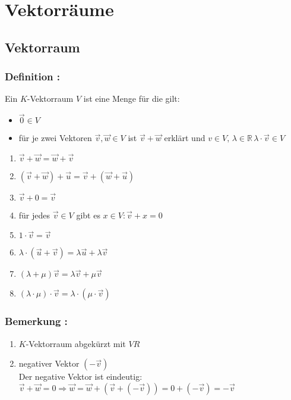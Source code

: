 \section{Vektorräume}
%
%
%
\subsection{Vektorraum}
%
\subsubsection{Definition :}
Ein $K$-Vektorraum $V$ ist eine Menge für die gilt:
\begin{itemize}
	\item $\vec{0}\in V$
	\item für je zwei Vektoren $\vec{v},\vec{w}\in V$ ist $\vec{v}+\vec{w}$ erklärt und $v \in V, 
		\, \lambda \in \mathbb{R} \, \lambda \cdot \vec{v} \in V$
\end{itemize}
%
\begin{multicols}{2} 
\begin{enumerate}
	\item $\vec{v} + \vec{w} = \vec{w} + \vec{v}$
	\item $(\vec{v}+\vec{w})+\vec{u}=\vec{v}+(\vec{w}+\vec{u})$
	\item $\vec{v}+0=\vec{v}$
	\item für jedes $\vec{v} \in V$ gibt es $x \in V:\vec{v}+x=0$
	\item $1\cdot \vec{v}=\vec{v}$
	\item $\lambda\cdot(\vec{u}+\vec{v})=\lambda\vec{u}+\lambda\vec{v}$
	\item$(\lambda+\mu)\vec{v}=\lambda\vec{v}+\mu\vec{v}$
	\item $(\lambda \cdot \mu)\cdot \vec{v} = \lambda \cdot (\mu\cdot\vec{v})$
\end{enumerate}
\end{multicols}
%
%
%
\subsubsection{Bemerkung :}
\begin{enumerate}
	\item $K$-Vektorraum abgekürzt mit $VR$
	\item negativer Vektor $(-\vec{v})$\\
		Der negative Vektor ist eindeutig: $\vec{v}+\vec{w}=0 \Rightarrow 
		\vec{w}=\vec{w}+(\vec{v}+(-\vec{v}))=0+(-\vec{v})=-\vec{v}$
\end{enumerate}
%
%
%
